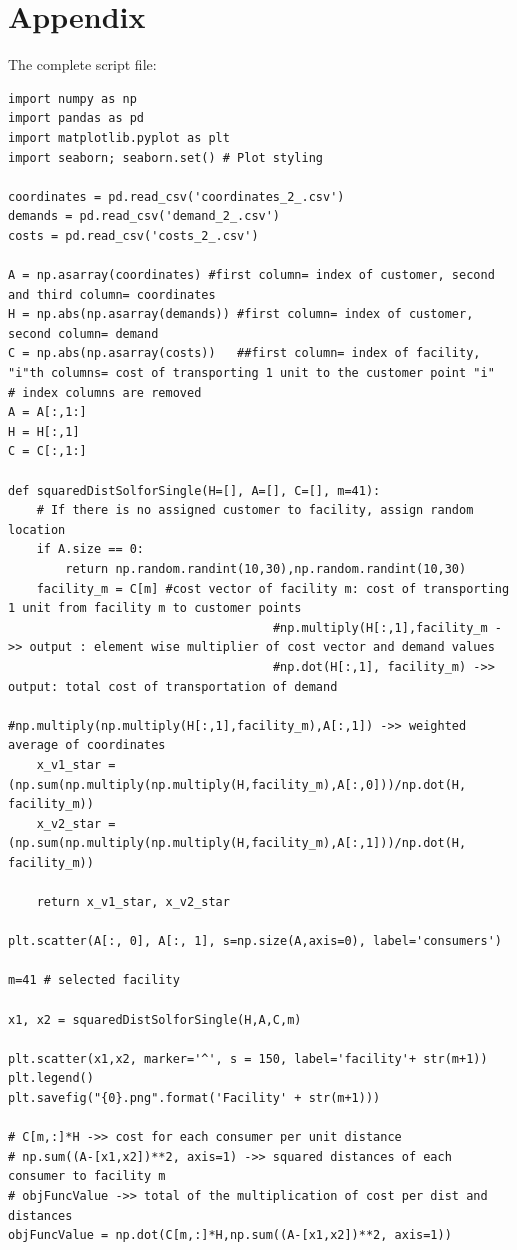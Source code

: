 \documentclass[12pt]{article}
\begin{document}
\section{Appendix}
The complete script file:
\begin{lstlisting}[style=pythonstyle,numbers=none]
import numpy as np
import pandas as pd
import matplotlib.pyplot as plt
import seaborn; seaborn.set() # Plot styling

coordinates = pd.read_csv('coordinates_2_.csv')
demands = pd.read_csv('demand_2_.csv')
costs = pd.read_csv('costs_2_.csv')

A = np.asarray(coordinates) #first column= index of customer, second and third column= coordinates
H = np.abs(np.asarray(demands)) #first column= index of customer, second column= demand
C = np.abs(np.asarray(costs))   ##first column= index of facility, "i"th columns= cost of transporting 1 unit to the customer point "i"
# index columns are removed
A = A[:,1:]
H = H[:,1]
C = C[:,1:]  

def squaredDistSolforSingle(H=[], A=[], C=[], m=41):
    # If there is no assigned customer to facility, assign random location
    if A.size == 0:
        return np.random.randint(10,30),np.random.randint(10,30)
    facility_m = C[m] #cost vector of facility m: cost of transporting 1 unit from facility m to customer points
                                     #np.multiply(H[:,1],facility_m ->> output : element wise multiplier of cost vector and demand values
                                     #np.dot(H[:,1], facility_m) ->> output: total cost of transportation of demand
                                     #np.multiply(np.multiply(H[:,1],facility_m),A[:,1]) ->> weighted average of coordinates   
    x_v1_star = (np.sum(np.multiply(np.multiply(H,facility_m),A[:,0]))/np.dot(H, facility_m))
    x_v2_star = (np.sum(np.multiply(np.multiply(H,facility_m),A[:,1]))/np.dot(H, facility_m))
    
    return x_v1_star, x_v2_star

plt.scatter(A[:, 0], A[:, 1], s=np.size(A,axis=0), label='consumers')

m=41 # selected facility

x1, x2 = squaredDistSolforSingle(H,A,C,m)

plt.scatter(x1,x2, marker='^', s = 150, label='facility'+ str(m+1))
plt.legend()
plt.savefig("{0}.png".format('Facility' + str(m+1)))

# C[m,:]*H ->> cost for each consumer per unit distance
# np.sum((A-[x1,x2])**2, axis=1) ->> squared distances of each consumer to facility m
# objFuncValue ->> total of the multiplication of cost per dist and distances
objFuncValue = np.dot(C[m,:]*H,np.sum((A-[x1,x2])**2, axis=1))


\end{lstlisting}
\end{document}
